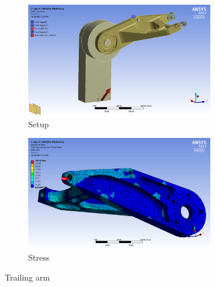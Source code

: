 \documentclass[10pt]{article}
\begin{document}
\begin{figure}[H]
\centering
\begin{subfigure}[b]{.48\textwidth}
\centering
\includegraphics[width=0.9\textwidth]{figures/fea/parts/MS00065-TrailingArm-Setup}
\caption{Setup}
\end{subfigure}
\begin{subfigure}[b]{.48\textwidth}
\centering
\includegraphics[width=0.9\textwidth]{figures/fea/parts/MS00065-TrailingArm-Stress}
\caption{Stress}
\end{subfigure}
\caption{Trailing arm}
\label{fig:MS00065-TrailingArm}
\end{figure}
\end{document}
